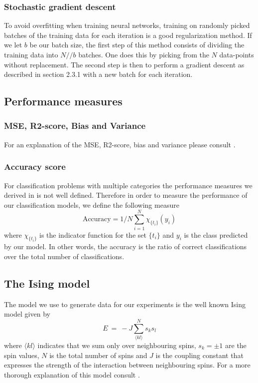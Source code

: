 \documentclass[a4paper,english]{article}
\begin{document}
\subsubsection{Stochastic gradient descent}
To avoid overfitting when training neural networks, training on 
randomly picked batches of the training data for each iteration is a good
regularization method. If we let $b$ be our batch size, the first step of
this method consists of dividing the training data into $N//b$ batches. 
One does this by picking from the $N$ data-points without replacement. 
The second step is then to perform a gradient descent as described in 
section 2.3.1 with a new batch for each iteration.

\subsection{Performance measures}
\subsubsection{MSE, R2-score, Bias and Variance}
For an explanation of the MSE, R2-score, bias and variance please
consult \cite{baarravndal}.
\subsubsection{Accuracy score}
For classification problems with multiple categories the performance
measures we derived in \cite{baarravndal} is not well defined.
Therefore in order to measure the performance of our classification models,
we define the following measure
\begin{equation}
    \text{Accuracy} = 1/N \sum_{i=1}^N \chi_{\{t_i\}}(y_i)
\end{equation}
where $\chi_{\{t_i\}}$ is the indicator function for the set
$\{t_i\}$ and $y_i$ is the class predicted by our model. 
In other words, the accuracy is the ratio of correct classifications 
over the total number of classifications.

\subsection{The Ising model}
The model we use to generate data for our experiments is the well known
Ising model given by
\begin{equation}
    E \ = \ - J \sum_{\langle kl \rangle}^N s_k s_l
\end{equation}
where $\langle kl \rangle$ indicates that we sum only over neighbouring
spins, 
$s_k = \pm 1$ are the spin values, $N$ is the total number of spins and $J$ is the coupling 
constant that expresses the strength of the interaction between 
neighbouring spins. For a more thorough explanation of this model
consult \cite{ising}.
\end{document}
